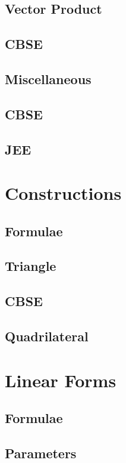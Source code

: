 \documentclass[journal]{IEEEtran}
\begin{document}
\subsection{Vector Product}

\subsection{CBSE}

\subsection{Miscellaneous}

\subsection{CBSE}

\subsection{JEE}

\newpage
\section{Constructions}
\subsection{Formulae}

\subsection{Triangle}

\subsection{CBSE}

\subsection{Quadrilateral}

\newpage
\section{Linear Forms}
\subsection{Formulae}

\subsection{Parameters}

\end{document}
